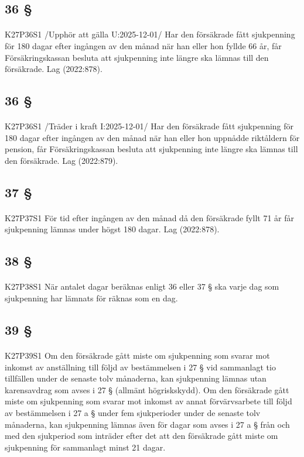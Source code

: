 \documentclass[a4paper,notitlepage,openany,10pt]{book}
\begin{document}
\subsection*{36 §}
\paragraph*{}
{\tiny K27P36S1}
/Upphör att gälla U:2025-12-01/
Har den försäkrade fått sjukpenning för 180 dagar efter ingången av den månad när han eller hon fyllde 66 år, får Försäkringskassan besluta att sjukpenning inte längre ska lämnas till den försäkrade.
Lag (2022:878).
\subsection*{36 §}
\paragraph*{}
{\tiny K27P36S1}
/Träder i kraft I:2025-12-01/
Har den försäkrade fått sjukpenning för 180 dagar efter ingången av den månad när han eller hon uppnådde riktåldern för pension, får Försäkringskassan besluta att sjukpenning inte längre ska lämnas till den försäkrade.
Lag (2022:879).
\subsection*{37 §}
\paragraph*{}
{\tiny K27P37S1}
För tid efter ingången av den månad då den försäkrade fyllt 71 år får sjukpenning lämnas under högst 180 dagar.
Lag (2022:878).
\subsection*{38 §}
\paragraph*{}
{\tiny K27P38S1}
När antalet dagar beräknas enligt 36 eller 37 § ska varje dag som sjukpenning har lämnats för räknas som en dag.
\subsection*{39 §}
\paragraph*{}
{\tiny K27P39S1}
Om den försäkrade gått miste om sjukpenning som svarar mot inkomst av anställning till följd av bestämmelsen i 27 § vid sammanlagt tio tillfällen under de senaste tolv månaderna, kan sjukpenning lämnas utan karensavdrag som avses i 27 § (allmänt högriskskydd). Om den försäkrade gått miste om sjukpenning som svarar mot inkomst av annat förvärvsarbete till följd av bestämmelsen i 27 a § under fem sjukperioder under de senaste tolv månaderna, kan sjukpenning lämnas även för dagar som avses i 27 a § från och med den sjukperiod som inträder efter det att den försäkrade gått miste om sjukpenning för sammanlagt minst 21 dagar.
\end{document}
